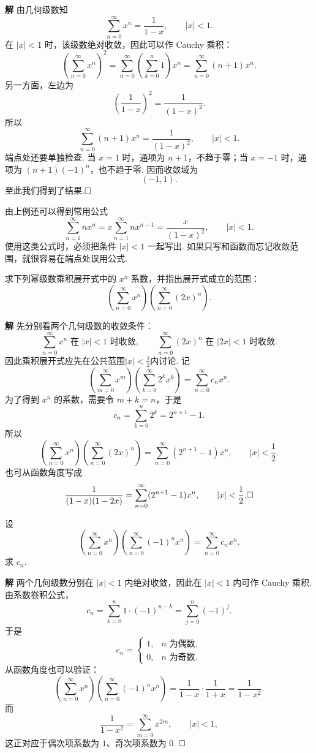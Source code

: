 \documentclass{ctexart}
\newenvironment{custom}[1]{\par\noindent \textbf{#1}\quad}{\par\vspace{1em}}
\begin{document}
\begin{custom}{解}
由几何级数知
\[
\sum_{n=0}^{\infty}x^n=\frac{1}{1-x},\qquad |x|<1.
\]
在 $|x|<1$ 时，该级数绝对收敛，因此可以作 Cauchy 乘积：
\[
\left(\sum_{n=0}^{\infty}x^n\right)^2
=
\sum_{n=0}^{\infty}\left(\sum_{k=0}^{n}1\right)x^n
=
\sum_{n=0}^{\infty}(n+1)x^n.
\]
另一方面，左边为
\[
\left(\frac{1}{1-x}\right)^2=\frac{1}{(1-x)^2}.
\]
所以
\[
\sum_{n=0}^{\infty}(n+1)x^n=\frac{1}{(1-x)^2},\qquad |x|<1.
\]
端点处还要单独检查. 当 $x=1$ 时，通项为 $n+1$，不趋于零；当 $x=-1$ 时，通项为 $(n+1)(-1)^n$，也不趋于零. 因而收敛域为
\[
(-1,1).
\]
至此我们得到了结果.$\hfill{\square}$
\end{custom}

由上例还可以得到常用公式
\[
\sum_{n=1}^{\infty}nx^n
=x\sum_{n=1}^{\infty}nx^{n-1}
=\frac{x}{(1-x)^2},\qquad |x|<1.
\]
使用这类公式时，必须把条件 $|x|<1$ 一起写出. 如果只写和函数而忘记收敛范围，就很容易在端点处误用公式.

\begin{example}
求下列幂级数乘积展开式中的 $x^n$ 系数，并指出展开式成立的范围：
\[
\left(\sum_{n=0}^{\infty}x^n\right)
\left(\sum_{n=0}^{\infty}(2x)^n\right).
\]
\end{example}

\begin{custom}{解}
先分别看两个几何级数的收敛条件：
\[
\sum_{n=0}^{\infty}x^n \text{ 在 } |x|<1 \text{ 时收敛},
\qquad
\sum_{n=0}^{\infty}(2x)^n \text{ 在 } |2x|<1 \text{ 时收敛}.
\]
因此乘积展开式应先在公共范围$|x|<\frac12$内讨论. 记
\[
\left(\sum_{m=0}^{\infty}x^m\right)
\left(\sum_{k=0}^{\infty}2^kx^k\right)
=\sum_{n=0}^{\infty}c_nx^n.
\]
为了得到 $x^n$ 的系数，需要令 $m+k=n$，于是
\[
c_n=\sum_{k=0}^{n}2^k=2^{n+1}-1.
\]
所以
\[
\left(\sum_{n=0}^{\infty}x^n\right)
\left(\sum_{n=0}^{\infty}(2x)^n\right)
=\sum_{n=0}^{\infty}(2^{n+1}-1)x^n,
\qquad |x|<\frac12.
\]
也可从函数角度写成
\[
\frac{1}{(1-x)(1-2x)}
=
\sum_{n=0}^{\infty}(2^{n+1}-1)x^n,
\qquad |x|<\frac12.\hfill{\square}
\]

\end{custom}

\begin{example}
设
\[
\left(\sum_{n=0}^{\infty}x^n\right)
\left(\sum_{n=0}^{\infty}(-1)^nx^n\right)
=\sum_{n=0}^{\infty}c_nx^n.
\]
求 $c_n$.
\end{example}

\begin{custom}{解}
两个几何级数分别在 $|x|<1$ 内绝对收敛，因此在 $|x|<1$ 内可作 Cauchy 乘积. 由系数卷积公式，
\[
c_n=\sum_{k=0}^{n}1\cdot (-1)^{n-k}
=\sum_{j=0}^{n}(-1)^j.
\]
于是
\[
c_n=\begin{cases}
1, & n\text{ 为偶数},\\
0, & n\text{ 为奇数}.
\end{cases}
\]
从函数角度也可以验证：
\[
\left(\sum_{n=0}^{\infty}x^n\right)
\left(\sum_{n=0}^{\infty}(-1)^nx^n\right)
=\frac{1}{1-x}\cdot\frac{1}{1+x}
=\frac{1}{1-x^2}.
\]
而
\[
\frac{1}{1-x^2}=\sum_{m=0}^{\infty}x^{2m},\qquad |x|<1,
\]
这正对应于偶次项系数为 $1$、奇次项系数为 $0$. $\hfill{\square}$
\end{custom}
\end{document}
